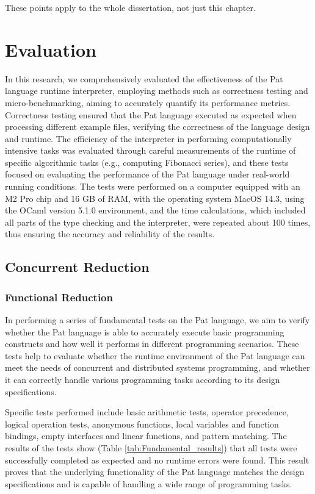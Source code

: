 \documentclass{l4proj}
\begin{document}
These points apply to the whole dissertation, not just this chapter.





\chapter{Evaluation} 
In this research, we comprehensively evaluated the effectiveness of the Pat language runtime interpreter, employing methods such as correctness testing and micro-benchmarking, aiming to accurately quantify its performance metrics. Correctness testing ensured that the Pat language executed as expected when processing different example files, verifying the correctness of the language design and runtime. The efficiency of the interpreter in performing computationally intensive tasks was evaluated through careful measurements of the runtime of specific algorithmic tasks (e.g., computing Fibonacci series), and these tests focused on evaluating the performance of the Pat language under real-world running conditions. The tests were performed on a computer equipped with an M2 Pro chip and 16 GB of RAM, with the operating system MacOS 14.3, using the OCaml version 5.1.0 environment, and the time calculations, which included all parts of the type checking and the interpreter, were repeated about 100 times, thus ensuring the accuracy and reliability of the results.

\section{Concurrent Reduction}

\subsection{Functional Reduction}
In performing a series of fundamental tests on the Pat language, we aim to verify whether the Pat language is able to accurately execute basic programming constructs and how well it performs in different programming scenarios. These tests help to evaluate whether the runtime environment of the Pat language can meet the needs of concurrent and distributed systems programming, and whether it can correctly handle various programming tasks according to its design specifications.

Specific tests performed include basic arithmetic tests, operator precedence, logical operation tests, anonymous functions, local variables and function bindings, empty interfaces and linear functions, and pattern matching. The results of the tests show (Table \ref{tab:Fundamental_results}) that all tests were successfully completed as expected and no runtime errors were found. This result proves that the underlying functionality of the Pat language matches the design specifications and is capable of handling a wide range of programming tasks.
\end{document}
